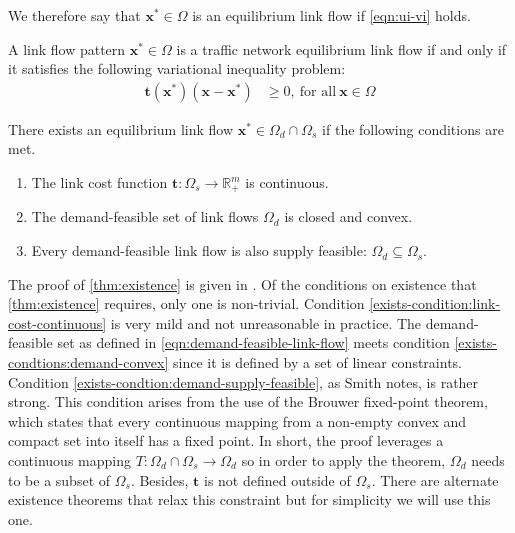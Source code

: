 We therefore say that $\mathbf{x^*}\in\Omega$ is an equilibrium link flow if \eqref{eqn:ui-vi} holds.

\begin{theorem}
    \label{thm:ui-vi}
    A link flow pattern $\mathbf{x}^* \in \Omega$ is a traffic network equilibrium link flow if and only if it satisfies the following variational inequality problem:
    \begin{align}
        \mathbf{t}(\mathbf{x^*})(\mathbf{x}- \mathbf{x^*}) &\geq 0,\ \text{for all}\ \mathbf{x} \in \Omega \label{eqn:ui-vi}
    \end{align}
\end{theorem}

\begin{theorem}[Existence]
\label{thm:existence}
    There exists an equilibrium link flow $\mathbf{x}^* \in \Omega_d \cap \Omega_s$ if the following conditions are met.
    \begin{enumerate}
        \item The link cost function $\mathbf{t}: \Omega_s \to \mathbb{R}_+^m$ is continuous.\label{exists-condition:link-cost-continuous}
        \item The demand-feasible set of link flows $\Omega_d$ is closed and convex.\label{exists-condtions:demand-convex}
        \item Every demand-feasible link flow is also supply feasible: $\Omega_d \subseteq \Omega_s$. \label{exists-condtion:demand-supply-feasible}
    \end{enumerate}
\end{theorem}

The proof of \cref{thm:existence} is given in \citet{smith1979existence}.
Of the conditions on existence that \cref{thm:existence} requires, only one is non-trivial.
Condition \ref{exists-condition:link-cost-continuous} is very mild and not unreasonable in practice.
The demand-feasible set as defined in \eqref{eqn:demand-feasible-link-flow} meets condition \ref{exists-condtions:demand-convex} since it is defined by a set of linear constraints.
Condition \ref{exists-condtion:demand-supply-feasible}, as Smith notes, is rather strong.
This condition arises from the use of the Brouwer fixed-point theorem, which states that every continuous mapping from a non-empty convex and compact set into itself has a fixed point.
In short, the proof leverages a continuous mapping  $T: \Omega_d\cap \Omega_s \to \Omega_d$ so in order to apply the theorem, $\Omega_d$ needs to be a subset of $\Omega_s$.
Besides, $\mathbf{t}$ is not defined outside of $\Omega_s$.
There are alternate existence theorems that relax this constraint but for simplicity we will use this one. 

